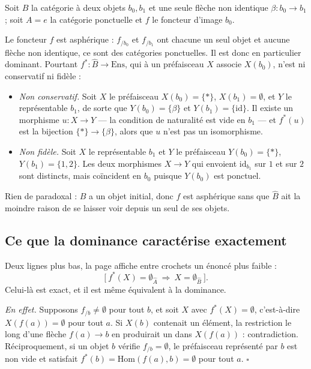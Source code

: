 \documentclass[11pt,a4paper]{article}
\begin{document}
Soit $B$ la catégorie à deux objets $b_{0}, b_{1}$ et une seule flèche non
identique $\beta : b_{0} \to b_{1}$ ; soit $A = e$ la catégorie ponctuelle et
$f$ le foncteur d'image $b_{0}$.


Le foncteur $f$ est asphérique : $f_{/b_{0}}$ et $f_{/b_{1}}$ ont chacune un
seul objet et aucune flèche non identique, ce sont des catégories ponctuelles.
Il est donc en particulier dominant. Pourtant $f^{*} : \hat{B} \to \mathrm{Ens}$,
qui à un préfaisceau $X$ associe $X(b_{0})$, n'est ni conservatif ni fidèle :

\begin{itemize}
\item \emph{Non conservatif.} Soit $X$ le préfaisceau $X(b_{0}) = \{*\}$,
$X(b_{1}) = \emptyset$, et $Y$ le représentable $b_{1}$, de sorte que
$Y(b_{0}) = \{\beta\}$ et $Y(b_{1}) = \{\mathrm{id}\}$. Il existe un morphisme
$u : X \to Y$ — la condition de naturalité est vide en $b_{1}$ — et $f^{*}(u)$
est la bijection $\{*\} \to \{\beta\}$, alors que $u$ n'est pas un isomorphisme.

\item \emph{Non fidèle.} Soit $X$ le représentable $b_{1}$ et $Y$ le préfaisceau
$Y(b_{0}) = \{*\}$, $Y(b_{1}) = \{1, 2\}$. Les deux morphismes $X \to Y$ qui
envoient $\mathrm{id}_{b_{1}}$ sur $1$ et sur $2$ sont distincts, mais coïncident
en $b_{0}$ puisque $Y(b_{0})$ est ponctuel.
\end{itemize}

Rien de paradoxal : $B$ a un objet initial, donc $f$ est asphérique sans que
$\hat{B}$ ait la moindre raison de se laisser voir depuis un seul de ses objets.

\subsection*{Ce que la dominance caractérise exactement}

Deux lignes plus bas, la page affiche entre crochets un énoncé plus faible :
\[
\bigl[\ f^{*}(X) = \emptyset_{\hat{A}} \ \Longrightarrow\
X = \emptyset_{\hat{B}}\ \bigr].
\]
Celui-là est exact, et il est même équivalent à la dominance.

\emph{En effet.} Supposons $f_{/b} \neq \emptyset$ pour tout $b$, et soit $X$
avec $f^{*}(X) = \emptyset$, c'est-à-dire $X(f(a)) = \emptyset$ pour tout $a$.
Si $X(b)$ contenait un élément, la restriction le long d'une flèche
$f(a) \to b$ en produirait un dans $X(f(a))$ : contradiction. Réciproquement, si
un objet $b$ vérifie $f_{/b} = \emptyset$, le préfaisceau représenté par $b$ est
non vide et satisfait $f^{*}(b) = \mathrm{Hom}(f(a), b) = \emptyset$ pour tout
$a$. \qquad$\square$
\end{document}
